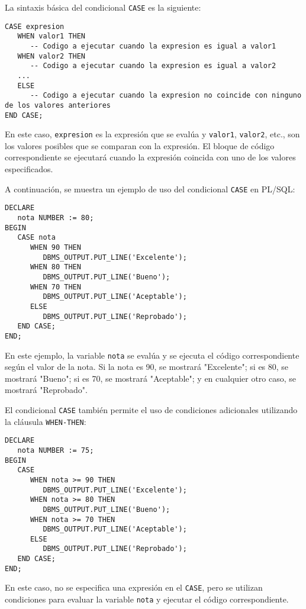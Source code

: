 \documentclass[executivepaper]{article}
\begin{document}
La sintaxis básica del condicional \texttt{CASE} es la siguiente:

\begin{lstlisting}
CASE expresion
   WHEN valor1 THEN
      -- Codigo a ejecutar cuando la expresion es igual a valor1
   WHEN valor2 THEN
      -- Codigo a ejecutar cuando la expresion es igual a valor2
   ...
   ELSE
      -- Codigo a ejecutar cuando la expresion no coincide con ninguno de los valores anteriores
END CASE;
\end{lstlisting}

En este caso, \texttt{expresion} es la expresión que se evalúa y \texttt{valor1}, \texttt{valor2}, etc., son los valores posibles que se comparan con la expresión. El bloque de código correspondiente se ejecutará cuando la expresión coincida con uno de los valores especificados.

A continuación, se muestra un ejemplo de uso del condicional \texttt{CASE} en PL/SQL:

\begin{lstlisting}
DECLARE
   nota NUMBER := 80;
BEGIN
   CASE nota
      WHEN 90 THEN
         DBMS_OUTPUT.PUT_LINE('Excelente');
      WHEN 80 THEN
         DBMS_OUTPUT.PUT_LINE('Bueno');
      WHEN 70 THEN
         DBMS_OUTPUT.PUT_LINE('Aceptable');
      ELSE
         DBMS_OUTPUT.PUT_LINE('Reprobado');
   END CASE;
END;
\end{lstlisting}

En este ejemplo, la variable \texttt{nota} se evalúa y se ejecuta el código correspondiente según el valor de la nota. Si la nota es 90, se mostrará "Excelente"; si es 80, se mostrará "Bueno"; si es 70, se mostrará "Aceptable"; y en cualquier otro caso, se mostrará "Reprobado".

El condicional \texttt{CASE} también permite el uso de condiciones adicionales utilizando la cláusula \texttt{WHEN-THEN}:

\begin{lstlisting}
DECLARE
   nota NUMBER := 75;
BEGIN
   CASE
      WHEN nota >= 90 THEN
         DBMS_OUTPUT.PUT_LINE('Excelente');
      WHEN nota >= 80 THEN
         DBMS_OUTPUT.PUT_LINE('Bueno');
      WHEN nota >= 70 THEN
         DBMS_OUTPUT.PUT_LINE('Aceptable');
      ELSE
         DBMS_OUTPUT.PUT_LINE('Reprobado');
   END CASE;
END;
\end{lstlisting}

En este caso, no se especifica una expresión en el \texttt{CASE}, pero se utilizan condiciones para evaluar la variable \texttt{nota} y ejecutar el código correspondiente.
\end{document}
